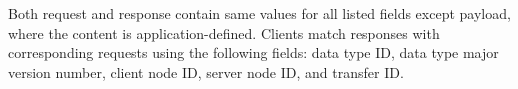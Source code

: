 Both request and response contain same values for all listed fields except payload,
where the content is application-defined.
Clients match responses with corresponding requests using the following fields:
data type ID, data type major version number, client node ID, server node ID, and transfer ID.
